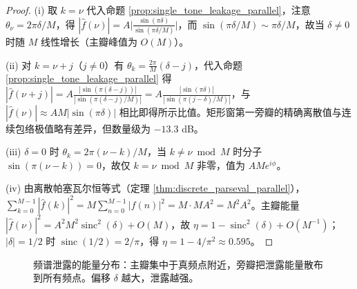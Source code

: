 \begin{proof}
(i) 取 $k=\nu$ 代入命题 \ref{prop:single_tone_leakage_parallel}，注意 $\theta_\nu=2\pi\delta/M$，得 $|\hat f(\nu)|=A\big|\frac{\sin(\pi\delta)}{\sin(\pi\delta/M)}\big|$，而 $\sin(\pi\delta/M)\sim\pi\delta/M$，故当 $\delta\ne0$ 时随 $M$ 线性增长（主瓣峰值为 $O(M)$）。

(ii) 对 $k=\nu+j$（$j\ne0$）有 $\theta_k=\frac{2\pi}{M}(\delta-j)$，代入命题 \ref{prop:single_tone_leakage_parallel} 得 $|\hat f(\nu+j)|=A\frac{|\sin(\pi(\delta-j))|}{|\sin(\pi(\delta-j)/M)|}=A\frac{|\sin(\pi\delta)|}{|\sin(\pi(j-\delta)/M)|}$，与 $|\hat f(\nu)|\approx AM|\sin(\pi\delta)|$ 相比即得所示比值。矩形窗第一旁瓣的精确离散值与连续包络极值略有差异，但数量级为 $-13.3$ dB。

(iii) $\delta=0$ 时 $\theta_k=2\pi(\nu-k)/M$，当 $k\ne\nu\bmod M$ 时分子 $\sin(\pi(\nu-k))=0$，故仅 $k=\nu\bmod M$ 非零，值为 $AMe^{i\phi}$。

(iv) 由离散帕塞瓦尔恒等式（定理 \ref{thm:discrete_parseval_parallel}），
$\sum_{k=0}^{M-1}|\hat f(k)|^2=M\sum_{n=0}^{M-1}|f(n)|^2=M\cdot MA^2=M^2A^2$。主瓣能量 $|\hat f(\nu)|^2=A^2M^2\operatorname{sinc}^2(\delta)+O(M)$，故 $\eta=1-\operatorname{sinc}^2(\delta)+O(M^{-1})$；$|\delta|=1/2$ 时 $\operatorname{sinc}(1/2)=2/\pi$，得 $\eta=1-4/\pi^2\approx0.595$。
\end{proof}

\begin{figure}[htbp]
\centering
{}
\caption{频谱泄露的能量分布：主瓣集中于真频点附近，旁瓣把泄露能量散布到所有频点。偏移 $\delta$ 越大，泄露越强。}
\label{fig:spectral_leakage}
\end{figure}


